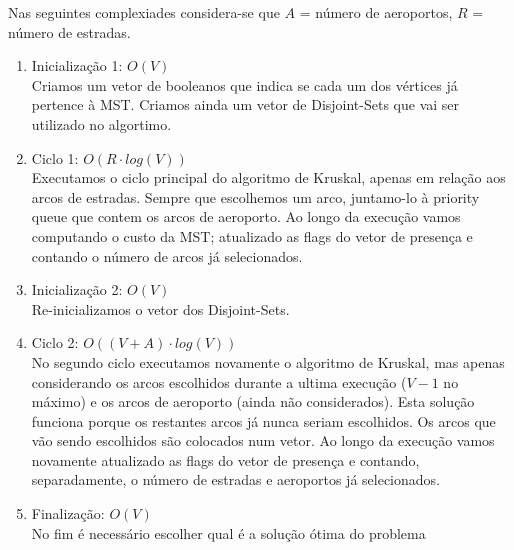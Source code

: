 \documentclass[a4paper]{article}
\begin{document}
	Nas seguintes complexiades considera-se que $A$ = número de aeroportos, $R$ = número de estradas.

	\begin{enumerate}
		\item Inicialização 1: $O(V)$\\
			Criamos um vetor de booleanos que indica se cada um dos vértices já
			pertence à MST.
			Criamos ainda um vetor de Disjoint-Sets que vai ser utilizado no algortimo.
		\item Ciclo 1: $O(R\cdot log(V))$\\
			Executamos o ciclo principal do algoritmo de Kruskal, apenas em relação
			aos arcos de estradas.
			Sempre que escolhemos um arco, juntamo-lo à priority queue que contem os arcos de aeroporto.
			Ao longo da execução vamos computando o custo da MST; atualizado as
			flags do vetor de presença e contando o número de arcos já selecionados.
		\item Inicialização 2: $O(V)$\\
			Re-inicializamos o vetor dos Disjoint-Sets.
		\item Ciclo 2: $O( (V + A) \cdot log(V))$\\
			No segundo ciclo executamos novamente o algoritmo de Kruskal, mas apenas considerando
			os arcos escolhidos durante a ultima execução ($V-1$ no máximo) e os arcos de aeroporto (ainda não considerados).
			Esta solução funciona porque os restantes arcos já nunca seriam escolhidos.
			Os arcos que vão sendo escolhidos são colocados num vetor.
			Ao longo da execução vamos novamente atualizado as flags do vetor de presença
			e contando, separadamente, o número de estradas e aeroportos já selecionados.
		\item Finalização: $O(V)$\\
			No fim é necessário escolher qual é a solução ótima do problema


	\end{enumerate}


  \begin{center}
  \end{center}
\end{document}
